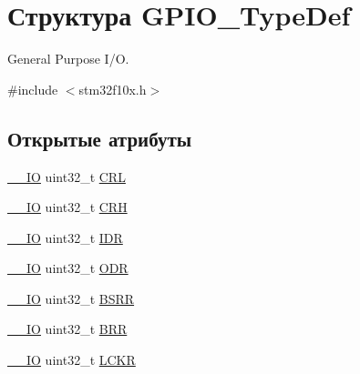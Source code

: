 \hypertarget{struct_g_p_i_o___type_def}{}\section{Структура G\+P\+I\+O\+\_\+\+Type\+Def}
\label{struct_g_p_i_o___type_def}


General Purpose I/O.  




{\ttfamily \#include $<$stm32f10x.\+h$>$}

\subsection*{Открытые атрибуты}
\begin{DoxyCompactItemize}
\item 
\mbox{\hyperlink{group___c_m_s_i_s___c_m3__core__definitions_gaec43007d9998a0a0e01faede4133d6be}{\+\_\+\+\_\+\+IO}} uint32\+\_\+t \mbox{\hyperlink{struct_g_p_i_o___type_def_a218d21e9ca712cec4ca8f00406b2ec29}{C\+RL}}
\item 
\mbox{\hyperlink{group___c_m_s_i_s___c_m3__core__definitions_gaec43007d9998a0a0e01faede4133d6be}{\+\_\+\+\_\+\+IO}} uint32\+\_\+t \mbox{\hyperlink{struct_g_p_i_o___type_def_afe53502a3dbf9e7dcf9ac83f67ac481d}{C\+RH}}
\item 
\mbox{\hyperlink{group___c_m_s_i_s___c_m3__core__definitions_gaec43007d9998a0a0e01faede4133d6be}{\+\_\+\+\_\+\+IO}} uint32\+\_\+t \mbox{\hyperlink{struct_g_p_i_o___type_def_acf11156409414ad8841bb0b62959ee96}{I\+DR}}
\item 
\mbox{\hyperlink{group___c_m_s_i_s___c_m3__core__definitions_gaec43007d9998a0a0e01faede4133d6be}{\+\_\+\+\_\+\+IO}} uint32\+\_\+t \mbox{\hyperlink{struct_g_p_i_o___type_def_a6fb78f4a978a36032cdeac93ac3c9c8b}{O\+DR}}
\item 
\mbox{\hyperlink{group___c_m_s_i_s___c_m3__core__definitions_gaec43007d9998a0a0e01faede4133d6be}{\+\_\+\+\_\+\+IO}} uint32\+\_\+t \mbox{\hyperlink{struct_g_p_i_o___type_def_acd6f21e08912b484c030ca8b18e11cd6}{B\+S\+RR}}
\item 
\mbox{\hyperlink{group___c_m_s_i_s___c_m3__core__definitions_gaec43007d9998a0a0e01faede4133d6be}{\+\_\+\+\_\+\+IO}} uint32\+\_\+t \mbox{\hyperlink{struct_g_p_i_o___type_def_aab918bfbfae459789db1fd0b220c7f21}{B\+RR}}
\item 
\mbox{\hyperlink{group___c_m_s_i_s___c_m3__core__definitions_gaec43007d9998a0a0e01faede4133d6be}{\+\_\+\+\_\+\+IO}} uint32\+\_\+t \mbox{\hyperlink{struct_g_p_i_o___type_def_a95a59d4b1d52be521f3246028be32f3e}{L\+C\+KR}}
\end{DoxyCompactItemize}


